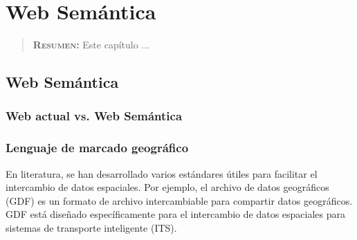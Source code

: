 


\chapter{Web Semántica}
\label{ch:web-semantinca}

\begin{quote}
  {\bf\textsc{Resumen:}} Este capítulo ...
\end{quote}

\section{Web Semántica}

\subsection{Web actual vs. Web Semántica}



\subsection{Lenguaje de marcado geográfico}

En literatura, se han desarrollado varios estándares útiles para facilitar el intercambio de datos espaciales. Por ejemplo, el archivo de datos geográficos (GDF) es un formato de archivo intercambiable para compartir datos geográficos. GDF está diseñado específicamente para el intercambio de datos espaciales para sistemas de transporte inteligente (ITS).



